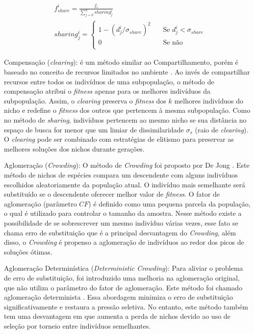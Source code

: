 \begin{equation}
\label{eq:sharing}
\begin{split}
& f_{share}^i = \frac{f_i}{\sum_{j=0}^{n} sharing_j^i} \\
& sharing_j^i =
	\begin{cases}
	1 - (d_j^i/\sigma_{share})^2 	& \quad \text{Se } d_j^i < \sigma_{share}\\
	0 							& \quad \text{Se não}\\
	\end{cases}
\end{split}
\end{equation}

Compensação (\textit{clearing}): é um método similar ao Compartilhamento, porém é baseado no conceito de recursos limitados no ambiente \cite{clearing}. Ao invés de compartilhar recursos entre todos os indivíduos de uma subpopulação, o método de compensação atribui o \textit{fitness} apenas para os melhores indivíduos da subpopulação. Assim, o \textit{clearing} preserva o \textit{fitness} dos $k$ melhores indivíduos do nicho e redefine o \textit{fitness} dos outros que pertencem à mesma subpopulação. Como no método de \textit{sharing}, indivíduos pertencem ao mesmo nicho se sua distância no espaço de busca for menor que um limiar de dissimilaridade $\sigma_s$ (raio de \textit{clearing}). O \textit{clearing} pode ser combinado com estratégias de elitismo para preservar as melhores soluções dos nichos durante gerações.

Aglomeração (\textit{Crowding}): O método de \textit{Crowding} foi proposto por De Jong \cite{crowding}. Este método de nichos de espécies compara um descendente com alguns indivíduos escolhidos aleatoriamente da população atual. O indivíduo mais semelhante será substituído se o descendente oferecer melhor valor de \textit{fitness}. O fator de aglomeração (parâmetro $CF$) é definido como uma pequena parcela da população, o qual é utilizado para controlar o tamanho da amostra. Nesse método existe a possibilidade de se sobrescrever um mesmo indivíduo várias vezes, esse fato se chama erro de substituição que é a principal desvantagem do \textit{Crowding}, além disso, o \textit{Crowding} é propenso a aglomeração de indivíduos ao redor dos picos de soluções ótimas.

Aglomeração Determinística (\textit{Deterministic Crowding}): Para aliviar o problema de erro de substituição, foi introduzido uma melhoria na aglomeração original, que não utiliza o parâmetro do fator de aglomeração. Este método foi chamado aglomeração determinista \cite{deterministic_crowding}. Essa abordagem minimiza o erro de substituição significativamente e restaura a pressão seletiva. No entanto, este método também tem uma desvantagem em que aumenta a perda de nichos devido ao uso de seleção por torneio entre indivíduos semelhantes.

